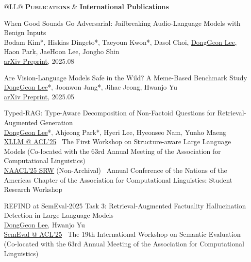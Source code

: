 \documentclass[11pt,a4paper]{article}
\newlength{\leftcolumn}
\newlength{\rightcolumn}
\newlength{\midrightcolumn}
\newcounter{pubnum}
\newenvironment{publications}
{\begin{list}{}
    {\setlength{\leftmargin}{1.35in}
     \setlength{\itemsep}{0.5em}
     \setlength{\labelsep}{0em}
     \renewcommand{\makelabel}[1]{##1}}}
{\end{list}}
\newcommand{\pubitem}[1]{%
    \addtocounter{pubnum}{-1}%
    \item[\textup{[\arabic{pubnum}]}] #1%
}
\begin{document}
\vspace{1em}

\begin{tabular}{@{}L{\leftcolumn}L{\midrightcolumn}@{}}
\textcolor{sectioncolor}{\textsc{\textbf{Publications}}} & \textbf{International Publications}
\end{tabular}
\vspace{-0.5em}

\begin{publications}

\pubitem{
    When Good Sounds Go Adversarial: Jailbreaking Audio-Language Models with Benign Inputs \\
        Bodam Kim*, Hiskias Dingeto*, Taeyoun Kwon*, Dasol Choi, \underline{DongGeon Lee}, Haon Park, JaeHoon Lee, Jongho Shin \\[3pt]
        \href{https://arxiv.org/abs/2508.03365}{arXiv Preprint}, 2025.08
}

\pubitem{
    Are Vision-Language Models Safe in the Wild? A Meme-Based Benchmark Study\\
        \underline{DongGeon Lee}*, Joonwon Jang*, Jihae Jeong,  Hwanjo Yu \\[3pt]
        \href{https://arxiv.org/abs/2505.15389v1}{arXiv Preprint}, 2025.05
}

\pubitem{
    Typed-RAG: Type-Aware Decomposition of Non-Factoid Questions for Retrieval-Augmented Generation \\
        \underline{DongGeon Lee}*, Ahjeong Park*, Hyeri Lee, Hyeonseo Nam, Yunho Maeng \\[3pt]
        \href{https://aclanthology.org/2025.xllm-1.14/}{XLLM @ ACL'25} \textbar\ The First Workshop on Structure-aware Large Language Models (Co-located with the 63rd Annual Meeting of the Association for Computational Linguistics) \\[1.5pt]
        \href{https://naacl2025-srw.github.io/accepted}{NAACL'25 SRW} (Non-Archival) \textbar\ Annual Conference of the Nations of the Americas Chapter of the Association for Computational Linguistics: Student Research Workshop
        
}


\pubitem{
    REFIND at SemEval-2025 Task 3: Retrieval-Augmented Factuality Hallucination Detection in Large Language Models\\
        \underline{DongGeon Lee}, Hwanjo Yu \\[3pt]
        \href{https://arxiv.org/abs/2502.13622}{SemEval @ ACL'25} \textbar\ The 19th International Workshop on Semantic Evaluation (Co-located with the 63rd Annual Meeting of the Association for Computational Linguistics)
}


\end{publications}
\end{document}
